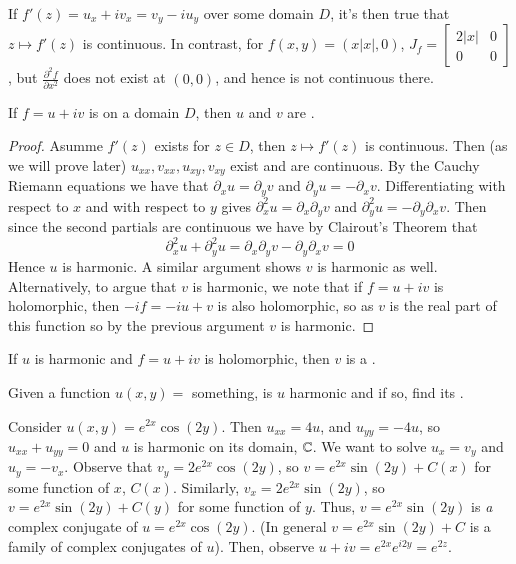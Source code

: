 If $f'(z) = u_x + iv_x = v_y - iu_y$ over some domain $D$, it's then true that $z \mapsto f'(z)$ is continuous. In contrast, for $f(x,y) = (x|x|,0)$, $J_f = \begin{bmatrix} 2|x|  & 0 \\ 0 & 0 \end{bmatrix}$, but $\frac{\partial^2 f}{\partial x^2}$ does not exist at $(0,0)$, and hence is not continuous there.

\begin{theorem}
    If $f= u+iv$ is  on a domain $D$, then $u$ and $v$ are .
\end{theorem}
\begin{proof}
    Asumme $f'(z)$ exists for $z \in D$, then $z \mapsto f'(z)$ is continuous. Then (as we will prove later) $u_{xx},v_{xx},u_{xy},v_{xy}$ exist and are continuous. By the Cauchy Riemann equations we have that $\partial_xu = \partial_yv$ and $\partial_yu = -\partial_xv$. Differentiating with respect to $x$ and with respect to $y$ gives $\partial_x^2u = \partial_x\partial_yv$ and $\partial_y^2u = -\partial_y\partial_xv$. Then since the second partials are continuous we have by Clairout's Theorem that \begin{equation*}
        \partial_x^2u+\partial_y^2u = \partial_x\partial_yv - \partial_y\partial_xv = 0
    \end{equation*}
    Hence $u$ is harmonic. A similar argument shows $v$ is harmonic as well. Alternatively, to argue that $v$ is harmonic, we note that if $f=u+iv$ is holomorphic, then $-if = -iu+v$ is also holomorphic, so as $v$ is the real part of this function so by the previous argument $v$ is harmonic.
\end{proof}


\begin{definition}
    If $u$ is harmonic and $f = u+iv$ is holomorphic, then $v$ is a .
\end{definition}



\begin{exercise}
    Given a function $u(x,y) = $ something, is $u$ harmonic and if so, find its .
\end{exercise}


\begin{example}
    Consider $u(x,y) = e^{2x}\cos(2y)$. Then $u_{xx} = 4u$, and $u_{yy} = -4u$, so $u_{xx}+u_{yy} = 0$ and $u$ is harmonic on its domain, $\mathbb C$. We want to solve $u_x = v_y$ and $u_y = -v_x$. Observe that $v_y = 2e^{2x}\cos(2y)$, so $v = e^{2x}\sin(2y)+C(x)$ for some function of $x$, $C(x)$. Similarly, $v_x = 2e^{2x}\sin(2y)$, so $v = e^{2x}\sin(2y) + C(y)$ for some function of $y$. Thus, $v = e^{2x}\sin(2y)$ is \emph{a} complex conjugate of $u = e^{2x}\cos(2y)$. (In general $v = e^{2x}\sin(2y) + C$ is a family of complex conjugates of $u$). Then, observe $u+iv = e^{2x}e^{i2y} = e^{2z}$.
\end{example}

